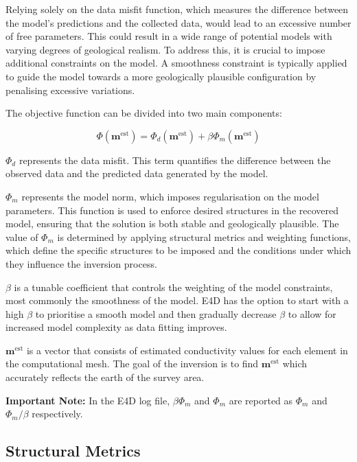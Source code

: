\documentclass[a4paper,12pt]{article}
\begin{document}
Relying solely on the data misfit function, which measures the difference between the model's predictions and the collected data, would lead to an excessive number of free parameters. This could result in a wide range of potential models with varying degrees of geological realism. To address this, it is crucial to impose additional constraints on the model. A smoothness constraint is typically applied to guide the model towards a more geologically plausible configuration by penalising excessive variations.

The objective function can be divided into two main components:

\begin{equation}
\Phi (\mathbf{m}^{\text{est}}) = \Phi_d (\mathbf{m}^{\text{est}}) + \beta \Phi_m (\mathbf{m}^{\text{est}})
\end{equation}

$\Phi_d$ represents the data misfit. This term quantifies the difference between the observed data and the predicted data generated by the model.

\(\Phi_m\) represents the model norm, which imposes regularisation on the model parameters. This function is used to enforce desired structures in the recovered model, ensuring that the solution is both stable and geologically plausible. The value of \(\Phi_m\) is determined by applying structural metrics and weighting functions, which define the specific structures to be imposed and the conditions under which they influence the inversion process.

$\beta$ is a tunable coefficient that controls the weighting of the model constraints, most commonly the smoothness of the model. E4D has the option to start with a high $\beta$ to prioritise a smooth model and then gradually decrease $\beta$ to allow for increased model complexity as data fitting improves.

\(\mathbf{m}^{\text{est}}\) is a vector that consists of estimated conductivity values for each element in the computational mesh. The goal of the inversion is to find \(\mathbf{m}^{\text{est}}\) which accurately reflects the earth of the survey area.

\begin{framed}
\noindent \textbf{Important Note:} In the E4D log file, $\beta \Phi_m$ and $\Phi_m$ are reported as $\Phi_m$ and $\Phi_m / \beta$ respectively.
\end{framed}

\subsection{Structural Metrics} \label{structural_metrics}
\end{document}
